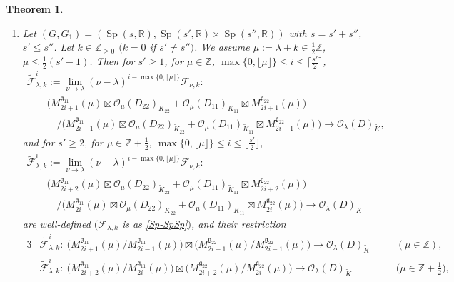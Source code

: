 \documentclass[pdftex]{sigma}
\numberwithin{equation}{section}
\newtheorem{Theorem}{Theorem}[section]
\newcommand{\BZ}{\mathbb{Z}}
\newcommand{\BR}{\mathbb{R}}
\newcommand{\fg}{\mathfrak{g}}
\newcommand{\cF}{\mathcal{F}}
\newcommand{\cO}{\mathcal{O}}
\begin{document}
\begin{Theorem}\quad
\begin{enumerate}\itemsep=0pt
\item[$(1)$] Let $(G,G_1)=(\operatorname{Sp}(s,\BR),\operatorname{Sp}(s',\BR)\times \operatorname{Sp}(s'',\BR))$ with $s=s'+s''$, $s'\le s''$.
Let $k\in\BZ_{\ge 0}$ $(k=0$ if $s'\ne s'')$. We assume $\mu:=\lambda+k\in\frac{1}{2}\BZ$, $\mu\le \frac{1}{2}(s'-1)$.
Then for $s'\ge 1$, for $\mu\in\BZ$, $\max\{0,\lfloor\mu\rfloor\}\le i\le \big\lceil \frac{s'}{2}\big\rceil$,
\begin{gather*}
\tilde{\cF}_{\lambda,k}^i:=\lim_{\nu\to\lambda} (\nu-\lambda)^{i-\max\{0,\lfloor\mu\rfloor\}}\cF_{\nu,k}\colon \\
\qquad{} \big(M_{2i+1}^{\fg_{11}}(\mu)\boxtimes \cO_\mu(D_{22})_{\tilde{K}_{22}}
+\cO_\mu(D_{11})_{\tilde{K}_{11}}\boxtimes M_{2i+1}^{\fg_{22}}(\mu)\big) \\
\qquad\quad {} /\big(M_{2i-1}^{\fg_{11}}(\mu)\boxtimes \cO_\mu(D_{22})_{\tilde{K}_{22}}
+\cO_\mu(D_{11})_{\tilde{K}_{11}}\boxtimes M_{2i-1}^{\fg_{22}}(\mu)\big)
\longrightarrow \cO_\lambda(D)_{\tilde{K}},
\end{gather*}
and for $s'\ge 2$, for $\mu\in\BZ+\frac{1}{2}$, $\max\{0,\lfloor\mu\rfloor\}\le i\le \big\lfloor \frac{s'}{2}\big\rfloor$,
\begin{gather*}
 \tilde{\cF}_{\lambda,k}^i:=\lim_{\nu\to\lambda} (\nu-\lambda)^{i-\max\{0,\lfloor\mu\rfloor\}}\cF_{\nu,k}\colon \\
\qquad{} \big(M_{2i+2}^{\fg_{11}}(\mu)\boxtimes \cO_\mu(D_{22})_{\tilde{K}_{22}}+\cO_\mu(D_{11})_{\tilde{K}_{11}}\boxtimes M_{2i+2}^{\fg_{22}}(\mu)\big) \\
\qquad\quad {} /\big(M_{2i}^{\fg_{11}}(\mu)\boxtimes \cO_\mu(D_{22})_{\tilde{K}_{22}}+\cO_\mu(D_{11})_{\tilde{K}_{11}}\boxtimes M_{2i}^{\fg_{22}}(\mu)\big)
\longrightarrow \cO_\lambda(D)_{\tilde{K}}
\end{gather*}
are well-defined $(\cF_{\lambda,k}$ is as \eqref{Sp-SpSp}$)$, and their restriction
\begin{alignat*}{3}
 & \tilde{\cF}_{\lambda,k}^i\colon \ \big(M_{2i+1}^{\fg_{11}}(\mu)/M_{2i-1}^{\fg_{11}}(\mu)\big)\boxtimes \big(M_{2i+1}^{\fg_{22}}(\mu)/M_{2i-1}^{\fg_{22}}(\mu)\big)
\longrightarrow \cO_\lambda(D)_{\tilde{K}} \quad && (\mu \in\BZ),&\\
&\tilde{\cF}_{\lambda,k}^i\colon \ \big(M_{2i+2}^{\fg_{11}}(\mu)/M_{2i}^{\fg_{11}}(\mu)\big)\boxtimes \big(M_{2i+2}^{\fg_{22}}(\mu)/M_{2i}^{\fg_{22}}(\mu)\big)
\longrightarrow \cO_\lambda(D)_{\tilde{K}} \quad && \big(\mu \in\BZ+\tfrac{1}{2}\big),&

\end{alignat*}
\end{enumerate}
\end{Theorem}
\end{document}
